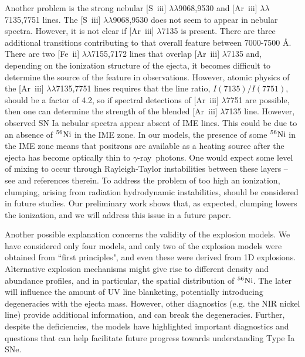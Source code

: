 \documentclass[useAMS,usenatbib,useasmath]{mnras}
\newcommand{\elem}[2][default]{$^{#1}{\rm #2}$}
\def\gray{$\gamma$-ray}
\newcommand{\ariii}{\mbox{Ar~{\sc iii}}}
\newcommand{\feii}{\mbox{Fe~{\sc ii}}}
\newcommand{\siii}{\mbox{S~{\sc iii}}}
\newcommand{\lb}{$\lambda$}
\begin{document}
Another problem is the strong nebular [\siii] \lb\lb9068,9530 and [\ariii] \lb\lb7135,7751 lines. The [\siii] \lb\lb9068,9530 does not seem to appear in nebular spectra. However, it is not clear if [\ariii] \lb7135 is present. There are three additional transitions contributing to that overall feature between 7000-7500 \AA. There are two [\feii] \lb\lb7155,7172 lines that overlap [\ariii] \lb7135 and, depending on the ionization structure of the ejecta, it becomes difficult to determine the source of the feature in observations. However, atomic physics of the [\ariii] \lb\lb7135,7751 lines requires that the line ratio, $I(7135)/I(7751)$, should be a factor of 4.2, so if spectral detections of [\ariii] \lb7751 are possible, then one can determine the strength of the blended [\ariii] \lb7135 line. However, observed SN Ia nebular spectra appear absent of IME lines. This could be due to an absence of \elem[56]{Ni} in the IME zone. In our models, the presence of  some \elem[56]{Ni} in the IME zone means that positrons are available as a heating source after the ejecta has become optically thin to \gray\ photons. One would expect some level of mixing to occur through Rayleigh-Taylor instabilities between these layers -- see \cite{Hicks2015} and references therein. To address the problem of too high an ionization, clumping, arising from radiation hydrodynamic instabilities, should be considered in future studies. Our preliminary work shows that, as expected, clumping lowers the ionization, and we will address this issue in a future paper.

Another possible explanation concerns the validity of the explosion models. We have considered only four models, and only two of the explosion models were obtained from ``first principles", and even these were derived from 1D explosions. Alternative explosion mechanisms might give rise to different density and abundance profiles, and in particular, the spatial distribution of \elem[56]{Ni}. The later will influence the amount of UV line blanketing, potentially introducing degeneracies with the ejecta mass. However, other diagnostics (e.g. the NIR nickel line) provide additional information, and can break the degeneracies. Further, despite the deficiencies, the models have highlighted important diagnostics and questions that can help facilitate future progress towards understanding Type Ia SNe.

\end{document}
